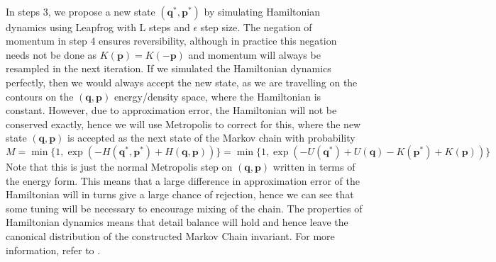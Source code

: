 \documentclass[11pt]{article}
\begin{document}
\\
In steps 3, we propose a new state $(\mathbf{q^{*}},\mathbf{p^{*}})$ by simulating Hamiltonian dynamics using Leapfrog with L steps and $\epsilon$ step size. The negation of momentum in step 4 ensures reversibility, although in practice this negation needs not be done as $K(\mathbf{p})=K(-\mathbf{p})$ and momentum will always be resampled in the next iteration. If we simulated the Hamiltonian dynamics perfectly, then we would always accept the new state, as we are travelling on the contours on the $(\mathbf{q},\mathbf{p})$ energy/density space, where the Hamiltonian is constant. However, due to approximation error, the Hamiltonian will not be conserved exactly, hence we will use Metropolis to correct for this, where the new state $(\mathbf{q},\mathbf{p})$ is accepted as the next state of the Markov chain with probability
\begin{equation}
M=\min \{1,\exp(-H(\mathbf{q^{*}},\mathbf{p^{*}})+H(\mathbf{q},\mathbf{p}))\} = \min\{1, \exp(-U(\mathbf{q^{*}})+U(\mathbf{q})-K(\mathbf{p^{*}})+K(\mathbf{p}))\}
\end{equation}
Note that this is just the normal Metropolis step on $(\mathbf{q},\mathbf{p})$ written in terms of the energy form. This means that a large difference in approximation error of the Hamiltonian  will in turns give a large chance of rejection, hence we can see that some tuning will be necessary to encourage mixing of the chain. The properties of Hamiltonian dynamics means that detail balance will hold and hence leave the canonical distribution of the constructed Markov Chain invariant. For more information, refer to \cite{neal}.
\end{document}
